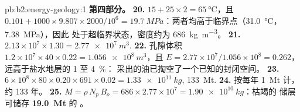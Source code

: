 \begin{solution}{pb:b2:energy-geology:1}
\noindent\textbf{第四部分。}
\textbf{20.} $15 + 25 \times 2 = \qty{65}{\celsius}$，且 $0.101 + 1000 \times 9.807 \times 2000/10^6
= \qty{19.7}{MPa}$：两者均高于临界点（\qty{31.0}{\celsius}，\qty{7.38}{MPa}），因此
 处于超临界状态，密度约为 \qty{686}{kg.m^{-3}}。
\textbf{21.} $2.13 \times 10^7 \times 1.30 = \qty{2.77e7}{m^3}$.
\textbf{22.} 孔隙体积 $1.2 \times 10^7 \times 40 \times 0.22 = \qty{1.056e8}{m^3}$，且 $E =
2.77 \times 10^7/1.056 \times 10^8 = 0.262$，远高于盐水地层的 1 至 \qty{4}{\percent}：
采出的油已掏空了一个已知的封闭空间。
\textbf{23.} $6 \times 10^8 \times 80 \times 0.20 \times 691 \times 0.02 = \qty{1.33e11}{kg}$,
\qty{133}{Mt}.
\textbf{24.} 按每年 \qty{1}{Mt} 计，约 133 年。
\textbf{25.} $M = \rho\,N_p\,B_o = 686 \times 2.77 \times 10^7 = \qty{1.90e10}{kg}$：枯竭的
储层可储存 \textbf{\qty[text-series-to-math=true]{19.0}{Mt}} 的 。
\end{solution}
